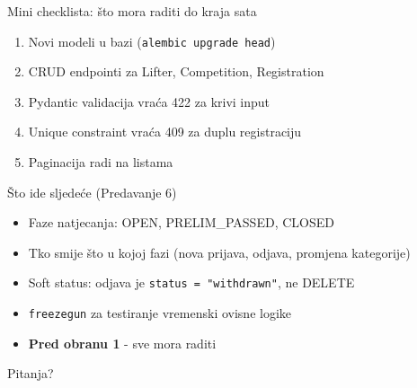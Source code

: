 \begin{frame}{Mini checklista: što mora raditi do kraja sata}
\begin{enumerate}
  \item Novi modeli u bazi (\texttt{alembic upgrade head})
  \item CRUD endpointi za Lifter, Competition, Registration
  \item Pydantic validacija vraća 422 za krivi input
  \item Unique constraint vraća 409 za duplu registraciju
  \item Paginacija radi na listama
\end{enumerate}
\end{frame}

\begin{frame}{Što ide sljedeće (Predavanje 6)}
\begin{itemize}
  \item Faze natjecanja: OPEN, PRELIM\_PASSED, CLOSED
  \item Tko smije što u kojoj fazi (nova prijava, odjava, promjena kategorije)
  \item Soft status: odjava je \texttt{status = "withdrawn"}, ne DELETE
  \item \texttt{freezegun} za testiranje vremenski ovisne logike
  \item \textbf{Pred obranu 1} - sve mora raditi
\end{itemize}

\vspace{0.8em}
\begin{center}
\Large Pitanja?
\end{center}
\end{frame}



